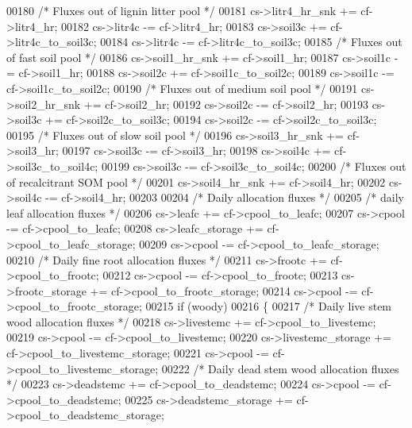 \begin{DoxyCode}
{00180     \textcolor{comment}{/* Fluxes out of lignin litter pool */}
00181     cs->litr4\_hr\_snk += cf->litr4\_hr;
00182     cs->litr4c       -= cf->litr4\_hr;
00183     cs->soil3c       += cf->litr4c\_to\_soil3c;
00184     cs->litr4c       -= cf->litr4c\_to\_soil3c;
00185     \textcolor{comment}{/* Fluxes out of fast soil pool */}
00186     cs->soil1\_hr\_snk += cf->soil1\_hr;
00187     cs->soil1c       -= cf->soil1\_hr;
00188     cs->soil2c       += cf->soil1c\_to\_soil2c;
00189     cs->soil1c       -= cf->soil1c\_to\_soil2c;
00190     \textcolor{comment}{/* Fluxes out of medium soil pool */}
00191     cs->soil2\_hr\_snk += cf->soil2\_hr;
00192     cs->soil2c       -= cf->soil2\_hr;
00193     cs->soil3c       += cf->soil2c\_to\_soil3c;
00194     cs->soil2c       -= cf->soil2c\_to\_soil3c;
00195     \textcolor{comment}{/* Fluxes out of slow soil pool */}
00196     cs->soil3\_hr\_snk += cf->soil3\_hr;
00197     cs->soil3c       -= cf->soil3\_hr;
00198     cs->soil4c       += cf->soil3c\_to\_soil4c;
00199     cs->soil3c       -= cf->soil3c\_to\_soil4c;
00200     \textcolor{comment}{/* Fluxes out of recalcitrant SOM pool */}
00201     cs->soil4\_hr\_snk += cf->soil4\_hr;
00202     cs->soil4c       -= cf->soil4\_hr;
00203     
00204     \textcolor{comment}{/* Daily allocation fluxes */}
00205     \textcolor{comment}{/* daily leaf allocation fluxes */}
00206     cs->leafc          += cf->cpool\_to\_leafc;
00207     cs->cpool          -= cf->cpool\_to\_leafc;
00208     cs->leafc\_storage  += cf->cpool\_to\_leafc\_storage;
00209     cs->cpool          -= cf->cpool\_to\_leafc\_storage;
00210     \textcolor{comment}{/* Daily fine root allocation fluxes */}
00211     cs->frootc         += cf->cpool\_to\_frootc;
00212     cs->cpool          -= cf->cpool\_to\_frootc;
00213     cs->frootc\_storage += cf->cpool\_to\_frootc\_storage;
00214     cs->cpool          -= cf->cpool\_to\_frootc\_storage;
00215     \textcolor{keywordflow}{if} (woody)
00216     \{
00217         \textcolor{comment}{/* Daily live stem wood allocation fluxes */}
00218         cs->livestemc          += cf->cpool\_to\_livestemc;
00219         cs->cpool              -= cf->cpool\_to\_livestemc;
00220         cs->livestemc\_storage  += cf->cpool\_to\_livestemc\_storage;
00221         cs->cpool              -= cf->cpool\_to\_livestemc\_storage;
00222         \textcolor{comment}{/* Daily dead stem wood allocation fluxes */}
00223         cs->deadstemc          += cf->cpool\_to\_deadstemc;
00224         cs->cpool              -= cf->cpool\_to\_deadstemc;
00225         cs->deadstemc\_storage  += cf->cpool\_to\_deadstemc\_storage;
}
\end{DoxyCode}

